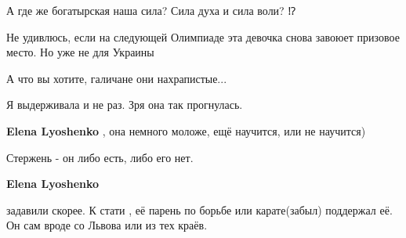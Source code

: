 \begin{itemize}
А где же богатырская наша сила? Сила духа и сила воли? ⁉️🤔

 
Не удивлюсь, если на следующей Олимпиаде эта девочка снова завоюет призовое место. Но уже не для Украины

 
А что вы хотите, галичане они нахрапистые...

 

Я выдерживала и не раз. Зря она так прогнулась.

\begin{itemize}
 
\textbf{Elena Lyoshenko} , она немного моложе, ещё научится, или не научится)

 

Стержень - он либо есть, либо его нет.

 
\textbf{Elena Lyoshenko} 

задавили скорее. К стати , её парень по борьбе или карате(забыл) поддержал её.
Он сам вроде со Львова или из тех краёв.



\end{itemize}
\end{itemize}
